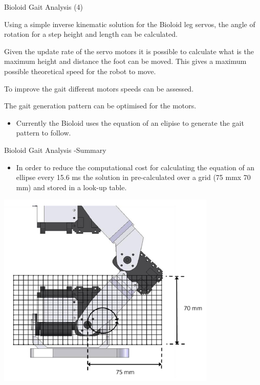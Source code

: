\documentclass[compress]{beamer}
\begin{document}
\begin{frame}{Bioloid Gait Analysis (4)}

    Using a simple inverse kinematic solution for the Bioloid leg servos,
    the angle of rotation for a step height and length can be calculated.

    Given the update rate of the servo motors it is possible to calculate
    what is the maximum height and distance the foot can be moved. This
    gives a maximum possible theoretical speed for the robot to move.

    To improve the gait different motors speeds can be assessed.

    The gait generation pattern can be optimised for the motors.

    \begin{itemize}

        \item Currently the Bioloid uses the equation of an elipise to generate the
            gait pattern to follow.
    \end{itemize}

\end{frame}

\begin{frame}{Bioloid Gait Analysis -Summary}

    \begin{itemize}

        \item In order to reduce the computational cost for calculating the equation
            of an ellipse every 15.6 ms the solution in pre-calculated over a grid
            (75 mmx 70 mm) and stored in a look-up table.
    \end{itemize}

    \begin{center}
        \includegraphics[width=0.8\linewidth]{image39}
    \end{center}
\end{frame}
\end{document}
